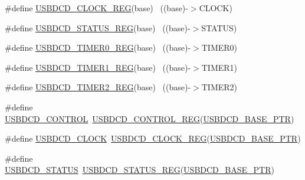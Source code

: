 \begin{DoxyCompactItemize}
\item 
\#define \hyperlink{group___u_s_b_d_c_d___register___accessor___macros_ga8bba9961332354ffeb00ecf680537695}{U\+S\+B\+D\+C\+D\+\_\+\+C\+L\+O\+C\+K\+\_\+\+R\+EG}(base)                                  ~((base)-\/$>$C\+L\+O\+CK)
\item 
\#define \hyperlink{group___u_s_b_d_c_d___register___accessor___macros_ga99a4ce6cc19f531916ab02aea07e14a9}{U\+S\+B\+D\+C\+D\+\_\+\+S\+T\+A\+T\+U\+S\+\_\+\+R\+EG}(base)                                ~((base)-\/$>$S\+T\+A\+T\+US)
\item 
\#define \hyperlink{group___u_s_b_d_c_d___register___accessor___macros_ga5eab5fbaf9280881c33dc0ed61dfbb80}{U\+S\+B\+D\+C\+D\+\_\+\+T\+I\+M\+E\+R0\+\_\+\+R\+EG}(base)                                ~((base)-\/$>$T\+I\+M\+E\+R0)
\item 
\#define \hyperlink{group___u_s_b_d_c_d___register___accessor___macros_ga88e54db7c70cc1d168f792ffd054ceea}{U\+S\+B\+D\+C\+D\+\_\+\+T\+I\+M\+E\+R1\+\_\+\+R\+EG}(base)                                ~((base)-\/$>$T\+I\+M\+E\+R1)
\item 
\#define \hyperlink{group___u_s_b_d_c_d___register___accessor___macros_ga0c14ac0966245ae63c84653a5c9ee453}{U\+S\+B\+D\+C\+D\+\_\+\+T\+I\+M\+E\+R2\+\_\+\+R\+EG}(base)                                ~((base)-\/$>$T\+I\+M\+E\+R2)
\item 
\#define \hyperlink{group___u_s_b_d_c_d___register___accessor___macros_ga70240dec5113361c1f15695ed389e323}{U\+S\+B\+D\+C\+D\+\_\+\+C\+O\+N\+T\+R\+OL}~\hyperlink{group___u_s_b_d_c_d___register___accessor___macros_ga257d5151df6a12b6afd43a0ab18bd985}{U\+S\+B\+D\+C\+D\+\_\+\+C\+O\+N\+T\+R\+O\+L\+\_\+\+R\+EG}(\hyperlink{group___u_s_b_d_c_d___peripheral_ga6289dc687e9b991508629237aeb61755}{U\+S\+B\+D\+C\+D\+\_\+\+B\+A\+S\+E\+\_\+\+P\+TR})
\item 
\#define \hyperlink{group___u_s_b_d_c_d___register___accessor___macros_ga543817a50fb8eddab8be17eeac66ed2f}{U\+S\+B\+D\+C\+D\+\_\+\+C\+L\+O\+CK}~\hyperlink{group___u_s_b_d_c_d___register___accessor___macros_ga8bba9961332354ffeb00ecf680537695}{U\+S\+B\+D\+C\+D\+\_\+\+C\+L\+O\+C\+K\+\_\+\+R\+EG}(\hyperlink{group___u_s_b_d_c_d___peripheral_ga6289dc687e9b991508629237aeb61755}{U\+S\+B\+D\+C\+D\+\_\+\+B\+A\+S\+E\+\_\+\+P\+TR})
\item 
\#define \hyperlink{group___u_s_b_d_c_d___register___accessor___macros_gacf092152e7551433538eb6aace1bc43a}{U\+S\+B\+D\+C\+D\+\_\+\+S\+T\+A\+T\+US}~\hyperlink{group___u_s_b_d_c_d___register___accessor___macros_ga99a4ce6cc19f531916ab02aea07e14a9}{U\+S\+B\+D\+C\+D\+\_\+\+S\+T\+A\+T\+U\+S\+\_\+\+R\+EG}(\hyperlink{group___u_s_b_d_c_d___peripheral_ga6289dc687e9b991508629237aeb61755}{U\+S\+B\+D\+C\+D\+\_\+\+B\+A\+S\+E\+\_\+\+P\+TR})

\end{DoxyCompactItemize}
